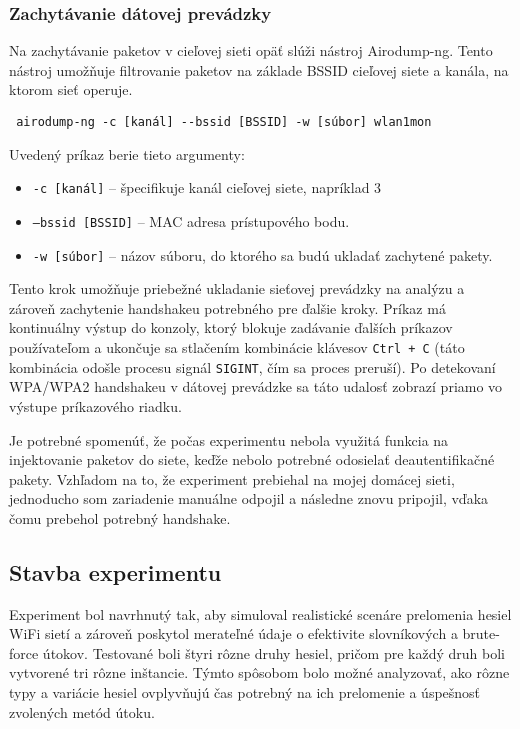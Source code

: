 \documentclass[12pt, twoside]{book}
\begin{document}
\subsubsection{Zachytávanie dátovej prevádzky} 
Na zachytávanie paketov v cieľovej sieti opäť slúži nástroj Airodump-ng. Tento nástroj umožňuje filtrovanie paketov na základe BSSID cieľovej siete a kanála, na ktorom sieť operuje.

\begin{verbatim} airodump-ng -c [kanál] --bssid [BSSID] -w [súbor] wlan1mon \end{verbatim}

Uvedený príkaz berie tieto argumenty: 

\begin{itemize} 
\item \texttt{-c [kanál]} – špecifikuje kanál cieľovej siete, napríklad 3 
\item \texttt{--bssid [BSSID]} – MAC adresa prístupového bodu. 
\item \texttt{-w [súbor]} – názov súboru, do ktorého sa budú ukladať zachytené pakety. 
\end{itemize}

Tento krok umožňuje priebežné ukladanie sieťovej prevádzky na analýzu a zároveň zachytenie handshakeu potrebného pre ďalšie kroky. Príkaz má kontinuálny výstup do konzoly, ktorý blokuje zadávanie ďalších príkazov používateľom a ukončuje sa stlačením kombinácie klávesov \texttt{Ctrl + C} (táto kombinácia odošle procesu signál \texttt{SIGINT}, čím sa proces preruší). Po detekovaní WPA/WPA2 handshakeu v dátovej prevádzke sa táto udalosť zobrazí priamo vo výstupe príkazového riadku.

Je potrebné spomenúť, že počas experimentu nebola využitá funkcia na injektovanie paketov do siete, keďže nebolo potrebné odosielať deautentifikačné pakety. Vzhľadom na to, že experiment prebiehal na mojej domácej sieti, jednoducho som zariadenie manuálne odpojil a následne znovu pripojil, vďaka čomu prebehol potrebný handshake.

\subsection{Stavba experimentu}
Experiment bol navrhnutý tak, aby simuloval realistické scenáre prelomenia hesiel WiFi sietí a zároveň poskytol merateľné údaje o efektivite slovníkových a brute-force útokov. Testované boli štyri rôzne druhy hesiel, pričom pre každý druh boli vytvorené tri rôzne inštancie. Týmto spôsobom bolo možné analyzovať, ako rôzne typy a variácie hesiel ovplyvňujú čas potrebný na ich prelomenie a úspešnosť zvolených metód útoku.
\end{document}
